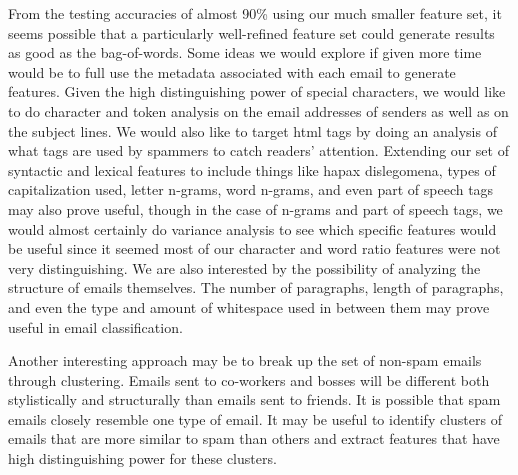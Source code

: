 \documentclass{article} %
\begin{document}
From the testing accuracies of almost 90\% using our much smaller feature set, it seems possible that a particularly well-refined feature set could generate results as good as the bag-of-words. Some ideas we would explore if given more time would be to full use the metadata associated with each email to generate features. Given the high distinguishing power of special characters, we would like to do character and token analysis on the email addresses of senders as well as on the subject lines. We would also like to target html tags by doing an analysis of what tags are used by spammers to catch readers' attention. Extending our set of syntactic and lexical features to include things like hapax dislegomena, types of capitalization used, letter n-grams, word n-grams, and even part of speech tags may also prove useful, though in the case of n-grams and part of speech tags, we would almost certainly do variance analysis to see which specific features would be useful since it seemed most of our character and word ratio features were not very distinguishing. We are also interested by the possibility of analyzing the structure of emails themselves. The number of paragraphs, length of paragraphs, and even the type and amount of whitespace used in between them may prove useful in email classification.\par

Another interesting approach may be to break up the set of non-spam emails through clustering. Emails sent to co-workers and bosses will be different both stylistically and structurally than emails sent to friends. It is possible that spam emails closely resemble one type of email. It may be useful to identify clusters of emails that are more similar to spam than others and extract features that have high distinguishing power for these clusters.
\end{document}
